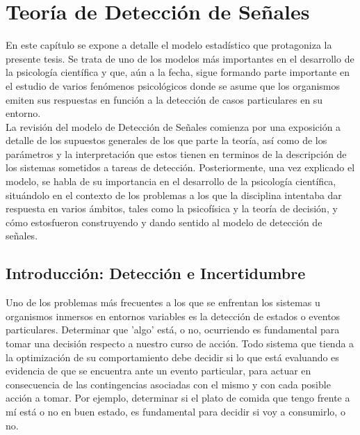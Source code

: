 
\chapter{Teoría de Detección de Señales} %

\label{Cap_SDT} %


\newcommand{\keyword}[1]{\textbf{#1}}
\newcommand{\tabhead}[1]{\textbf{#1}}
\newcommand{\code}[1]{\texttt{#1}}
\newcommand{\file}[1]{\texttt{\bfseries#1}}
\newcommand{\option}[1]{\texttt{\itshape#1}}


En este capítulo se expone a detalle el modelo estadístico que protagoniza la presente tesis. Se trata de uno de los modelos más importantes en el desarrollo de la psicología científica y que, aún a la fecha, sigue formando parte importante en el estudio de varios fenómenos psicológicos donde se asume que los organismos emiten sus respuestas en función a la detección de casos particulares en su entorno.\\

La revisión del modelo de Detección de Señales comienza por una exposición a detalle de los supuestos generales de los que parte la teoría, así como de los parámetros y la interpretación que estos tienen en terminos de la descripción de los sistemas sometidos a tareas de detección. Posteriormente, una vez explicado el modelo, se habla de su importancia en el desarrollo de la psicología científica, situándolo en el contexto de los problemas a los que la disciplina intentaba dar respuesta en varios ámbitos, tales como la psicofísica y la teoría de decisión, y cómo estosfueron construyendo y dando sentido al modelo de detección de señales.

\section{Introducción: Detección e Incertidumbre}

Uno de los problemas más frecuentes a los que se enfrentan los sistemas u organismos inmersos en entornos variables es la detección de estados o eventos particulares. Determinar que 'algo' está, o no, ocurriendo es fundamental para tomar una decisión respecto a nuestro curso de acción. Todo sistema que tienda a la optimización de su comportamiento debe decidir si lo que está evaluando es evidencia de que se encuentra ante un evento particular, para actuar en consecuencia de las contingencias asociadas con el mismo y con cada posible acción a tomar. Por ejemplo, determinar si el plato de comida que tengo frente a mí está o no en buen estado, es fundamental para decidir si voy a consumirlo, o no.\\


